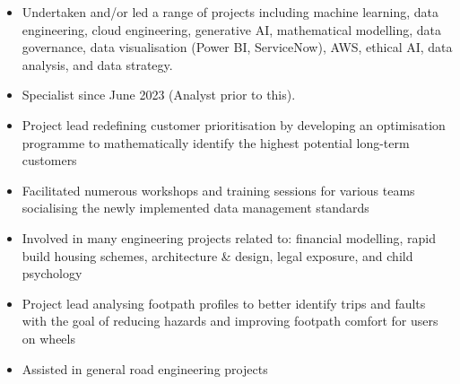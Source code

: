 \documentclass[10pt,a4paper,ragged2e,withhyper]{altacv}
\begin{document}
\begin{paracol}{2}

\begin{itemize}
\item Undertaken and/or led a range of projects including machine learning, data engineering, cloud engineering, generative AI, mathematical modelling, data governance, data visualisation (Power BI, ServiceNow), AWS, ethical AI, data analysis, and data strategy.
\item Specialist since June 2023 (Analyst prior to this).
\end{itemize}

\divider

\begin{itemize}
\item Project lead redefining customer prioritisation by developing an optimisation programme to mathematically identify the highest potential long-term customers
\item Facilitated numerous workshops and training sessions for various teams socialising the newly implemented data management standards
\end{itemize}

\divider

\begin{itemize}
\item Involved in many engineering projects related to: financial modelling, rapid build housing schemes, architecture \& design, legal exposure, and child psychology
\end{itemize}

\divider

\begin{itemize}
\item Project lead analysing footpath profiles to better identify trips and faults with the goal of reducing hazards and improving footpath comfort for users on wheels
\item Assisted in general road engineering projects
\end{itemize}


\end{paracol}
\end{document}
